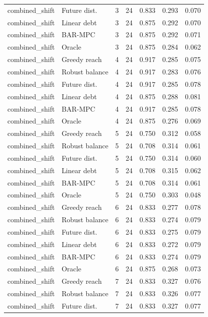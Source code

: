 \begin{longtable}{llrrrrr}
combined\_shift & Future dist. & 3 & 24 & 0.833 & 0.293 & 0.070 \\
combined\_shift & Linear debt & 3 & 24 & 0.875 & 0.292 & 0.070 \\
combined\_shift & BAR-MPC & 3 & 24 & 0.875 & 0.292 & 0.071 \\
combined\_shift & Oracle & 3 & 24 & 0.875 & 0.284 & 0.062 \\
combined\_shift & Greedy reach & 4 & 24 & 0.917 & 0.285 & 0.075 \\
combined\_shift & Robust balance & 4 & 24 & 0.917 & 0.283 & 0.076 \\
combined\_shift & Future dist. & 4 & 24 & 0.917 & 0.285 & 0.078 \\
combined\_shift & Linear debt & 4 & 24 & 0.875 & 0.288 & 0.081 \\
combined\_shift & BAR-MPC & 4 & 24 & 0.917 & 0.285 & 0.078 \\
combined\_shift & Oracle & 4 & 24 & 0.875 & 0.276 & 0.069 \\
combined\_shift & Greedy reach & 5 & 24 & 0.750 & 0.312 & 0.058 \\
combined\_shift & Robust balance & 5 & 24 & 0.708 & 0.314 & 0.061 \\
combined\_shift & Future dist. & 5 & 24 & 0.750 & 0.314 & 0.060 \\
combined\_shift & Linear debt & 5 & 24 & 0.708 & 0.315 & 0.062 \\
combined\_shift & BAR-MPC & 5 & 24 & 0.708 & 0.314 & 0.061 \\
combined\_shift & Oracle & 5 & 24 & 0.750 & 0.303 & 0.048 \\
combined\_shift & Greedy reach & 6 & 24 & 0.833 & 0.277 & 0.078 \\
combined\_shift & Robust balance & 6 & 24 & 0.833 & 0.274 & 0.079 \\
combined\_shift & Future dist. & 6 & 24 & 0.833 & 0.275 & 0.079 \\
combined\_shift & Linear debt & 6 & 24 & 0.833 & 0.272 & 0.079 \\
combined\_shift & BAR-MPC & 6 & 24 & 0.833 & 0.274 & 0.079 \\
combined\_shift & Oracle & 6 & 24 & 0.875 & 0.268 & 0.073 \\
combined\_shift & Greedy reach & 7 & 24 & 0.833 & 0.327 & 0.076 \\
combined\_shift & Robust balance & 7 & 24 & 0.833 & 0.326 & 0.077 \\
combined\_shift & Future dist. & 7 & 24 & 0.833 & 0.327 & 0.077 \\

\end{longtable}
